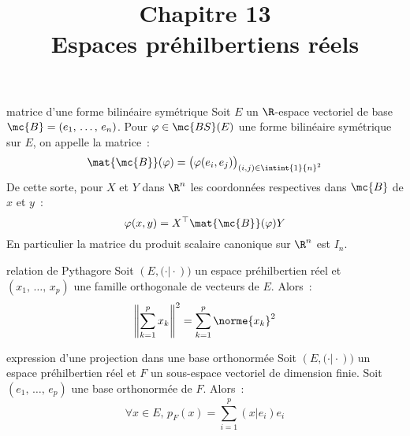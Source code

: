 

\setcounter{chapitre}{13}

\title{\Large Chapitre 13 \\ \Huge Espaces préhilbertiens réels}



\maketitle

\begin{definition}{}{matrice d'une forme bilinéaire symétrique}
    Soit $E$ un $\R$-espace vectoriel de base $\mc{B} = (e_1,\, \dots,\, e_n)$. Pour $\varphi \in \mc{BS}(E)$ une forme bilinéaire symétrique sur $E$, on appelle  la matrice~:
    $$\mat{\mc{B}}(\varphi) = \big(\varphi(e_i, e_j)\big)_{(i,j) \in \intint{1}{n}^2}$$
    De cette sorte, pour $X$ et $Y$ dans $\R^n$ les coordonnées respectives dans $\mc{B}$ de $x$ et $y$~:
    $$\varphi(x,y) = X^\top \mat{\mc{B}}(\varphi)Y$$
    En particulier la matrice du produit scalaire canonique sur $\R^n$ est $I_n$.
\end{definition}

\begin{proposition}{13.45}{relation de Pythagore}
    Soit $(E, \big(\cdot \vert \cdot)\big)$ un espace préhilbertien réel et $(x_1,\, \dots,\, x_p)$ une famille orthogonale de vecteurs de $E$. Alors~:
    $$\left\Vert \sum_{k=1}^p x_k \right\Vert^2 = \sum_{k=1}^p \norme{x_k}^2$$
\end{proposition}

\begin{theoreme}{13.50}{expression d'une projection dans une base orthonormée}
    Soit $(E, \big(\cdot \vert \cdot)\big)$ un espace préhilbertien réel et $F$ un sous-espace vectoriel de dimension finie. Soit $(e_1,\, \dots,\, e_p)$ une base orthonormée de $F$. Alors~:
    $$\forall x \in E,\, p_F(x) = \sum_{i=1}^{p}(x \vert e_i)e_i$$
\end{theoreme}

